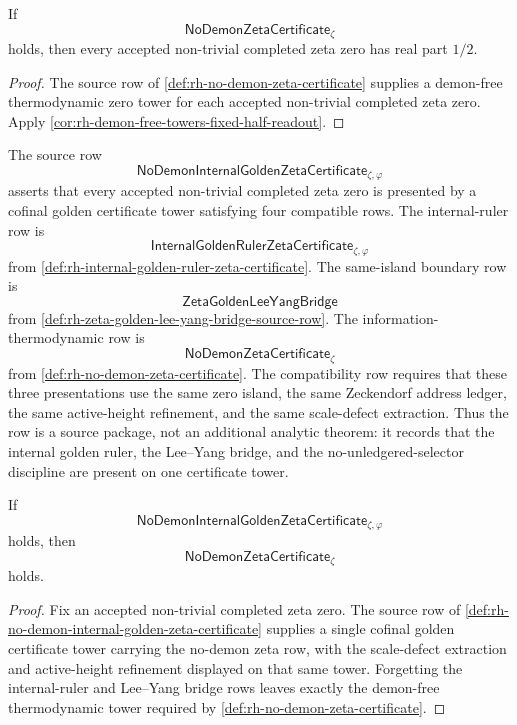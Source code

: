 \begin{corollary}
\label{cor:rh-no-demon-certificates-fixed-half-readouts}
If
$$
\mathsf{NoDemonZetaCertificate}_{\zeta}
$$
holds, then every accepted non-trivial completed zeta zero has real part
$1/2$.
\end{corollary}

\begin{proof}
The source row of \autoref{def:rh-no-demon-zeta-certificate} supplies a
demon-free thermodynamic zero tower for each accepted non-trivial
completed zeta zero.  Apply
\autoref{cor:rh-demon-free-towers-fixed-half-readout}.
\end{proof}

\begin{definition}
\label{def:rh-no-demon-internal-golden-zeta-certificate}
The source row
$$
\mathsf{NoDemonInternalGoldenZetaCertificate}_{\zeta,\varphi}
$$
asserts that every accepted non-trivial completed zeta zero is presented
by a cofinal golden certificate tower satisfying four compatible rows.
The internal-ruler row is
$$
\mathsf{InternalGoldenRulerZetaCertificate}_{\zeta,\varphi}
$$
from \autoref{def:rh-internal-golden-ruler-zeta-certificate}.  The
same-island boundary row is
$$
\mathsf{ZetaGoldenLeeYangBridge}
$$
from \autoref{def:rh-zeta-golden-lee-yang-bridge-source-row}.  The
information-thermodynamic row is
$$
\mathsf{NoDemonZetaCertificate}_{\zeta}
$$
from \autoref{def:rh-no-demon-zeta-certificate}.  The compatibility row
requires that these three presentations use the same zero island, the
same Zeckendorf address ledger, the same active-height refinement, and
the same scale-defect extraction.  Thus the row is a source package, not
an additional analytic theorem: it records that the internal golden
ruler, the Lee--Yang bridge, and the no-unledgered-selector discipline
are present on one certificate tower.
\end{definition}

\begin{theorem}
\label{thm:rh-no-demon-internal-golden-certificates-supply-thermodynamic-certificates}
If
$$
\mathsf{NoDemonInternalGoldenZetaCertificate}_{\zeta,\varphi}
$$
holds, then
$$
\mathsf{NoDemonZetaCertificate}_{\zeta}
$$
holds.
\end{theorem}

\begin{proof}
Fix an accepted non-trivial completed zeta zero.  The source row of
\autoref{def:rh-no-demon-internal-golden-zeta-certificate} supplies a
single cofinal golden certificate tower carrying the no-demon zeta row,
with the scale-defect extraction and active-height refinement displayed
on that same tower.  Forgetting the internal-ruler and Lee--Yang bridge
rows leaves exactly the demon-free thermodynamic tower required by
\autoref{def:rh-no-demon-zeta-certificate}.
\end{proof}

